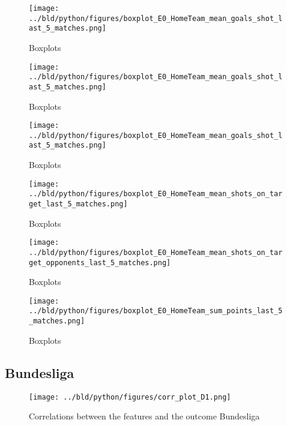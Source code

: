 \documentclass[11pt, a4paper, leqno]{article}
\begin{document}
\begin{figure}[H]
    \centering
    \texttt{[image: ../bld/python/figures/boxplot\_E0\_HomeTeam\_mean\_goals\_shot\_last\_5\_matches.png]}
    \caption{Boxplots}
    \label{fig:figure2}
\end{figure}

\begin{figure}[H]
    \centering
    \texttt{[image: ../bld/python/figures/boxplot\_E0\_HomeTeam\_mean\_goals\_shot\_last\_5\_matches.png]}
    \caption{Boxplots}
    \label{fig:figure2}
\end{figure}

\begin{figure}[H]
    \centering
    \texttt{[image: ../bld/python/figures/boxplot\_E0\_HomeTeam\_mean\_goals\_shot\_last\_5\_matches.png]}
    \caption{Boxplots}
    \label{fig:figure2}
\end{figure}

\begin{figure}[H]
    \centering
    \texttt{[image: ../bld/python/figures/boxplot\_E0\_HomeTeam\_mean\_shots\_on\_target\_last\_5\_matches.png]}
    \caption{Boxplots}
    \label{fig:figure2}
\end{figure}

\begin{figure}[H]
    \centering
    \texttt{[image: ../bld/python/figures/boxplot\_E0\_HomeTeam\_mean\_shots\_on\_target\_opponents\_last\_5\_matches.png]}
    \caption{Boxplots}
    \label{fig:figure2}
\end{figure}

\begin{figure}[H]
    \centering
    \texttt{[image: ../bld/python/figures/boxplot\_E0\_HomeTeam\_sum\_points\_last\_5\_matches.png]}
    \caption{Boxplots}
    \label{fig:figure2}
\end{figure}






\subsection{Bundesliga}
\begin{figure}[H]
    \centering
    \texttt{[image: ../bld/python/figures/corr\_plot\_D1.png]}
    \caption{Correlations between the features and the outcome Bundesliga}
    \label{fig:figure2}
\end{figure}
\end{document}
